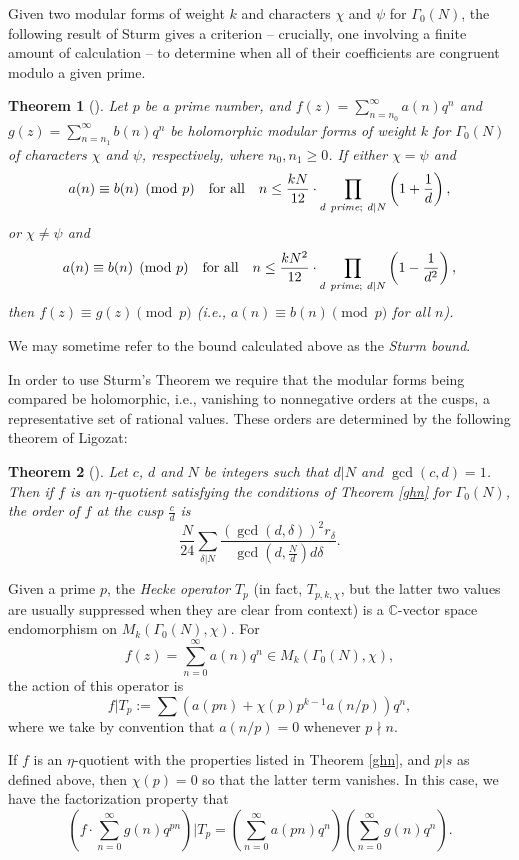 \documentclass[12pt]{amsart}
\newtheorem{theorem}{Theorem}%
\theoremstyle{definition}
\begin{document}
Given two modular forms of weight $k$ and characters $\chi$ and $\psi$ for $\Gamma_0(N)$, the following result of Sturm \cite{sturm} gives a criterion -- crucially, one involving a finite amount of calculation -- to determine when all of their coefficients are congruent modulo a given prime.
\begin{theorem} [\cite{sturm}]\label{sturmthe} Let $p$ be a prime number, and $f(z) = \sum_{n=n_0}^\infty a(n) q^n$ and $g(z) = \sum_{n=n_1}^\infty b(n) q^n$  be holomorphic modular forms of weight $k$ for $\Gamma_0(N)$ of characters $\chi$ and $\psi$, respectively, where $n_0,n_1\ge 0$.  If either $\chi=\psi$ and 
$$a(n) \equiv b(n) \pmod{p} \quad \text{for all} \quad n\le \frac{kN}{12}\cdot \prod_{d{\ }\emph{prime};{\ } d \vert N} \left(1+\frac{1}{d}\right),$$
or $\chi \neq \psi$ and
$$a(n) \equiv b(n) \pmod{p} \quad \text{for all} \quad n\le \frac{kN^2}{12}\cdot \prod_{d{\ }\emph{prime};{\ } d \vert N} \left(1-\frac{1}{d^2}\right),$$
then $f(z) \equiv g(z) \pmod{p}$ (i.e., $a(n) \equiv b(n) \pmod{p}$ for all $n$).
\end{theorem}

We may sometime refer to the bound calculated above as the \emph{Sturm bound}.

In order to use Sturm's Theorem we require that the modular forms being compared be holomorphic, i.e., vanishing to nonnegative orders at the cusps, a representative set of rational values.  These orders are determined by the following theorem of Ligozat:
\begin{theorem}[\cite{Ligo,Ono}]\label{ligozat} Let $c$, $d$ and $N$ be integers such that $d \vert N$ and $\gcd(c,d)=1$.  Then if $f$ is an $\eta$-quotient satisfying the conditions of Theorem \ref{ghn} for $\Gamma_0(N)$, the order of $f$ at the cusp $\frac{c}{d}$ is
$$\frac{N}{24} \sum_{\delta \vert N} \frac{\left(\gcd(d,\delta)\right)^2 r_\delta}{\gcd \left(d,\frac{N}{d}\right) d \delta}.$$
\end{theorem}

Given a prime $p$, the \emph{Hecke operator} $T_p$ (in fact, $T_{p,k,\chi}$, but the latter two values are usually suppressed when they are clear from context) is a $\mathbb{C}$-vector space endomorphism on $M_k(\Gamma_0(N),\chi)$.  For $$f(z) = \sum_{n=0}^\infty a(n) q^n \in M_k(\Gamma_0(N),\chi),$$ the action of this operator is
$$f \vert T_p := \sum (a(pn) + \chi(p) p^{k-1}a(n/p)) q^n,$$
where we take by convention that $a(n/p) = 0$ whenever $p \nmid n$.  

If $f$ is an $\eta$-quotient with the properties listed in Theorem \ref{ghn}, and $p \vert s$ as defined above, then $\chi(p) = 0$ so that the latter term vanishes.  In this case, we have the factorization property that $$\left( f \cdot \sum_{n=0}^\infty g(n) q^{pn} \right) \vert T_p = \left( \sum_{n=0}^{\infty} a(pn)q^n \right) \left(\sum_{n=0}^\infty g(n) q^n \right).$$
\end{document}
